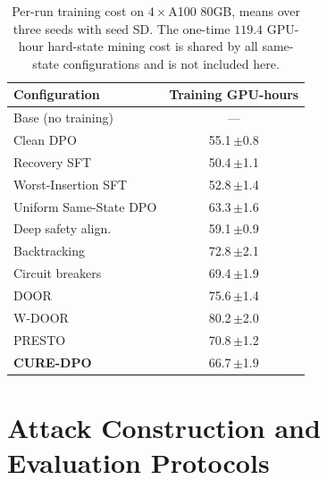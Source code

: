 \documentclass[11pt]{article}
\newcommand{\method}{CURE-DPO}
\begin{document}
\begin{table}[t]
  \centering
  \footnotesize
  \setlength{\tabcolsep}{4pt}
  \begin{tabular}{lc}
    \toprule
    Configuration & Training GPU-hours \\
    \midrule
    Base (no training)          & --- \\
    Clean DPO                   & 55.1\,{\scriptsize$\pm$0.8} \\
    Recovery SFT                & 50.4\,{\scriptsize$\pm$1.1} \\
    Worst-Insertion SFT         & 52.8\,{\scriptsize$\pm$1.4} \\
    Uniform Same-State DPO      & 63.3\,{\scriptsize$\pm$1.6} \\
    \midrule
    Deep safety align.          & 59.1\,{\scriptsize$\pm$0.9} \\
    Backtracking                & 72.8\,{\scriptsize$\pm$2.1} \\
    Circuit breakers            & 69.4\,{\scriptsize$\pm$1.9} \\
    DOOR                        & 75.6\,{\scriptsize$\pm$1.4} \\
    W-DOOR                      & 80.2\,{\scriptsize$\pm$2.0} \\
    PRESTO                      & 70.8\,{\scriptsize$\pm$1.2} \\
    \midrule
    \textbf{\method{}}          & 66.7\,{\scriptsize$\pm$1.9} \\
    \bottomrule
  \end{tabular}
  \caption{Per-run training cost on \(4\times\)A100 80GB, means over three
  seeds with seed SD. The one-time \(119.4\) GPU-hour hard-state mining cost is
  shared by all same-state configurations and is not included here.}
  \label{tab:gpu-hours}
\end{table}

\section{Attack Construction and Evaluation Protocols}
\label{app:attacks}
\end{document}
